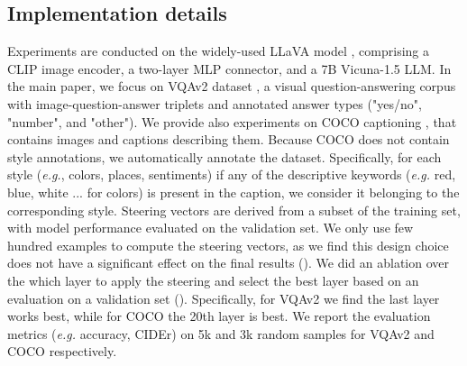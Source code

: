 \subsection{Implementation details}
\label{sec:app_model_steering_implem_detail}



Experiments are conducted on the widely-used LLaVA model \cite{liu2024improvedllava}, comprising a CLIP image encoder, a two-layer MLP connector, and a 7B Vicuna-1.5 LLM. In the main paper, we focus on VQAv2 dataset \cite{goyal2017makingvqav2}, a visual question-answering corpus with image-question-answer triplets and annotated answer types ("yes/no", "number", and "other"). We provide also experiments on COCO captioning \cite{lin2014microsoft}, that contains images and captions describing them. Because COCO does not contain style annotations, we automatically annotate the dataset. Specifically, for each style (\emph{e.g.}, colors, places, sentiments) if any of the descriptive keywords (\emph{e.g.} red, blue, white ... for colors) is present in the caption, we consider it belonging to the corresponding style.
Steering vectors are derived from a subset of the training set, with model performance evaluated on the validation set. We only use few hundred examples to compute the steering vectors, as we find this design choice does not have a significant effect on the final results (). We did an ablation over the which layer to apply the steering and select the best layer based on an evaluation on a validation set (). Specifically, for VQAv2 we find the last layer works best, while for COCO the 20th layer is best. We report the evaluation metrics (\emph{e.g.} accuracy, CIDEr) on 5k and 3k random samples for VQAv2 and COCO respectively.




